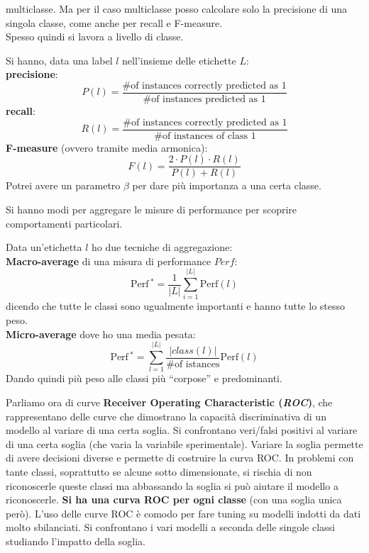 multiclasse. Ma per il caso multiclasse posso calcolare solo la precisione di
una singola classe, come anche per recall e F-measure.\\
Spesso quindi si lavora a livello di classe.
\begin{definizione}
  Si hanno, data una label $l$ nell'insieme delle etichette $L$:\\
  \textbf{precisione}:
  \[P(l)=\frac{\# \text {of instances correctly predicted as } 1}{\#\text {of
        instances predicted as } 1}\]
  \textbf{recall}:
  \[R(l)=\frac{\# \text {of instances correctly predicted as } 1}{\#\text {of
        instances of class } 1}\] 
  \textbf{F-measure} (ovvero tramite media armonica):
  \[F(l)=\frac{2 \cdot P(l) \cdot R(l)}{P(l)+R(l)}\]
  Potrei avere un parametro $\beta$ per dare più importanza a una certa classe.
\end{definizione}
Si hanno modi per aggregare le misure di performance per scoprire comportamenti
particolari. 
\begin{definizione}
  Data un'etichetta $l$ ho due tecniche di aggregazione:\\
  \textbf{Macro-average} di una misura di performance $Perf$:
  \[\text {Perf}\,^{*}=\frac{1}{|L|} \sum_{i=1}^{|L|} \text {Perf}(l)\]
  dicendo che tutte le classi sono ugualmente importanti e hanno tutte lo stesso
  peso.\\
  \noindent
  \textbf{Micro-average} dove ho una media pesata:
  \[\text {Perf}\,^{*}=\sum_{l=1}^{|L|} \frac{|class(l)|}{\#\text{of istances}}
    \text {Perf}(l)\] 
  Dando quindi più peso alle classi più ``corpose'' e predominanti.
\end{definizione}
Parliamo ora di curve \textbf{Receiver Operating Characteristic (\textit{ROC})},
che rappresentano delle curve che dimostrano la 
capacità discriminativa di un modello al variare di una certa soglia. Si
confrontano veri/falsi positivi al variare di una certa soglia (che varia la
variabile sperimentale). Variare la
soglia permette di avere decisioni diverse e permette di costruire la curva
ROC. In problemi con tante classi, soprattutto se alcune sotto dimensionate, si
rischia di non riconoscerle queste classi ma abbassando la soglia si può aiutare
il modello a riconoscerle. \textbf{Si ha una curva ROC per ogni classe} (con una
soglia unica però). L'uso delle curve ROC è comodo per fare tuning su modelli
indotti da dati molto sbilanciati. Si confrontano i vari modelli a seconda delle
singole classi studiando l'impatto della soglia. 

